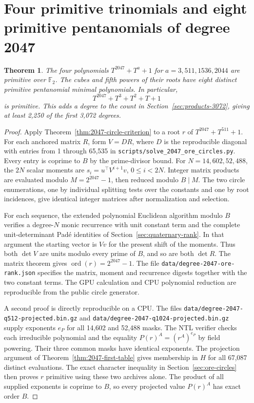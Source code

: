\documentclass[11pt]{article}
\newtheorem{theorem}{Theorem}
\begin{document}
\section{Four primitive trinomials and eight primitive pentanomials of degree 2047}
\label{sec:primitive2047}
\begin{theorem}\label{thm:primitive2047}
The four polynomials \(T^{2047}+T^a+1\) for
\(a=3,511,1536,2044\) are primitive over \(\mathbb F_2\).
The cubes and fifth powers of their roots have eight distinct primitive
pentanomial minimal polynomials. In particular,
\[
                     T^{2047}+T^3+T^2+T+1
\]
is primitive. This adds a degree to the count in
Section~\ref{sec:products-3072}, giving at least 2,250 of the first
3,072 degrees.
\end{theorem}
\begin{proof}
Apply Theorem~\ref{thm:2047-circle-criterion} to a root \(r\) of
\(T^{2047}+T^{511}+1\). For each anchored matrix \(R\), form
\(V=DR\), where \(D\) is the reproducible diagonal with entries from
1 through 65,535 in \nolinkurl{scripts/solve_2047_ore_circles.py}.
Every entry is coprime to \(B\) by the prime-divisor bound.
For \(N=14{,}602,52{,}488\), the \(2N\) scalar moments are
\(s_i=u^\top V^{i+1}v\), \(0\le i<2N\). Integer matrix products
are evaluated modulo \(M=2^{2047}-1\), then reduced modulo \(B\mid M\).
The two circle enumerations, one by individual
splitting tests over the constants and one by root incidences, give
identical integer matrices after normalization and selection.

For each sequence, the extended polynomial Euclidean algorithm modulo
\(B\) verifies a degree-\(N\) monic recurrence with unit constant term
and the complete unit-determinant Padé identities of
Section~\ref{sec:quaternary-rank}. In that argument the starting
vector is \(Vv\) for the present shift of the moments. Thus both
\(\det V\) are units modulo every prime of \(B\), and so are both
\(\det R\). The matrix theorem gives \(\operatorname{ord}(r)=2^{2047}-1\).
The file \nolinkurl{data/degree-2047-ore-rank.json} specifies the matrix,
moment and recurrence digests together with the two constant terms.
The GPU calculation and CPU polynomial reduction are reproducible
from the public circle generator.

A second proof is directly reproducible on a CPU. The files
\nolinkurl{data/degree-2047-q512-projected.bin.gz} and
\nolinkurl{data/degree-2047-q1024-projected.bin.gz} supply exponents
\(e_P\) for all 14,602 and 52,488 masks. The NTL verifier checks each
irreducible polynomial and the equality \(P(r)^A=(r^A)^{e_P}\) by
field powering. Their three common masks have identical exponents.
The projection argument of Theorem~\ref{thm:2047-first-table} gives
membership in \(H\) for all 67,087 distinct evaluations. The exact
character inequality in Section~\ref{sec:ore-circles} then proves
\(r\) primitive using these two archives alone. The product of all supplied
exponents is coprime to \(B\), so every projected value \(P(r)^A\)
has exact order \(B\).


\end{proof}
\end{document}
